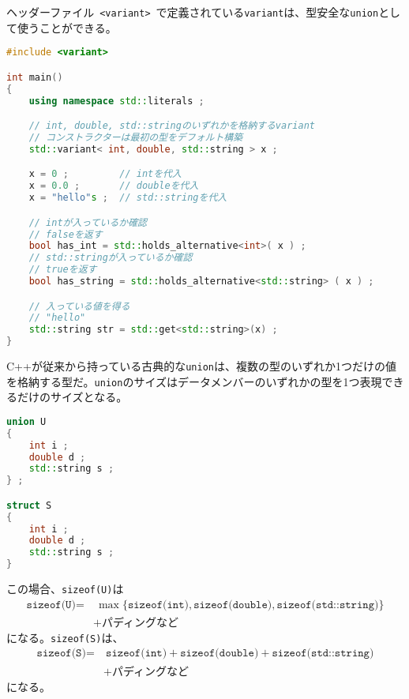 %

%

ヘッダーファイル~\lstinline!<variant>!~で定義されている\lstinline!variant!は、型安全な\lstinline!union!として使うことができる。

\begin{lstlisting}[language=C++]
#include <variant>

int main()
{
    using namespace std::literals ;

    // int, double, std::stringのいずれかを格納するvariant
    // コンストラクターは最初の型をデフォルト構築
    std::variant< int, double, std::string > x ;

    x = 0 ;         // intを代入
    x = 0.0 ;       // doubleを代入
    x = "hello"s ;  // std::stringを代入

    // intが入っているか確認
    // falseを返す
    bool has_int = std::holds_alternative<int>( x ) ;
    // std::stringが入っているか確認
    // trueを返す
    bool has_string = std::holds_alternative<std::string> ( x ) ;

    // 入っている値を得る
    // "hello"
    std::string str = std::get<std::string>(x) ;
}
\end{lstlisting}

%

C++が従来から持っている古典的な\lstinline!union!は、複数の型のいずれか1つだけの値を格納する型だ。\lstinline!union!のサイズはデータメンバーのいずれかの型を1つ表現できるだけのサイズとなる。

\begin{lstlisting}[language=C++]
union U
{
    int i ;
    double d ;
    std::string s ;
} ;

struct S
{
    int i ;
    double d ;
    std::string s ;
}
\end{lstlisting}

この場合、\lstinline!sizeof(U)!は
\small
\begin{align*}
    \texttt{sizeof(U)} = &~ \max \{ \texttt{sizeof(int)}, \texttt{sizeof(double)}, \texttt{sizeof(std::string)} \} \\
    &+ \texttt{パディングなど}
\end{align*}
\normalsize
になる。\lstinline!sizeof(S)!は、
\small
\begin{align*}
    \texttt{sizeof(S)} = &~ \texttt{sizeof(int)} + \texttt{sizeof(double)} + \texttt{sizeof(std::string)} \\
    &+ \texttt{パディングなど}
\end{align*}
\normalsize
になる。

